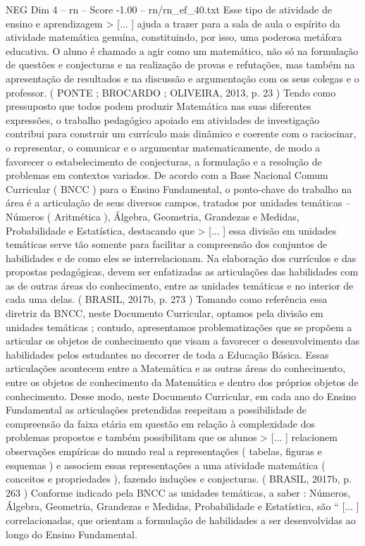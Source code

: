 \begin{textsample}{NEG Dim 4 – rn – Score -1.00 – rn/rn\_ef\_40.txt}
Esse tipo de atividade de ensino e aprendizagem > [... ] ajuda a trazer para a sala de aula o espírito da atividade matemática genuína, constituindo, por isso, uma poderosa metáfora educativa.
O aluno é chamado a agir como um matemático, não só na formulação de questões e conjecturas e na realização de provas e refutações, mas também na apresentação de resultados e na discussão e argumentação com os seus colegas e o professor. ( PONTE ; BROCARDO ; OLIVEIRA, 2013, p. 23 ) Tendo como pressuposto que todos podem produzir Matemática nas suas diferentes expressões, o trabalho pedagógico apoiado em atividades de investigação contribui para construir um currículo mais dinâmico e coerente com o raciocinar, o representar, o comunicar e o argumentar matematicamente, de modo a favorecer o estabelecimento de conjecturas, a formulação e a resolução de problemas em contextos variados.
De acordo com a Base Nacional Comum Curricular ( BNCC ) para o Ensino Fundamental, o ponto-chave do trabalho na área é a articulação de seus diversos campos, tratados por unidades temáticas – Números ( Aritmética ), Álgebra, Geometria, Grandezas e Medidas, Probabilidade e Estatística, destacando que > [... ] essa divisão em unidades temáticas serve tão somente para facilitar a compreensão dos conjuntos de habilidades e de como eles se interrelacionam.
Na elaboração dos currículos e das propostas pedagógicas, devem ser enfatizadas as articulações das habilidades com as de outras áreas do conhecimento, entre as unidades temáticas e no interior de cada uma delas. ( BRASIL, 2017b, p. 273 ) Tomando como referência essa diretriz da BNCC, neste Documento Curricular, optamos pela divisão em unidades temáticas ; contudo, apresentamos problematizações que se propõem a articular os objetos de conhecimento que visam a favorecer o desenvolvimento das habilidades pelos estudantes no decorrer de toda a Educação Básica.
Essas articulações acontecem entre a Matemática e as outras áreas do conhecimento, entre os objetos de conhecimento da Matemática e dentro dos próprios objetos de conhecimento.
Desse modo, neste Documento Curricular, em cada ano do Ensino Fundamental as articulações pretendidas respeitam a possibilidade de compreensão da faixa etária em questão em relação à complexidade dos problemas propostos e também possibilitam que os alunos > [... ] relacionem observações empíricas do mundo real a representações ( tabelas, figuras e esquemas ) e associem essas representações a uma atividade matemática ( conceitos e propriedades ), fazendo induções e conjecturas. ( BRASIL, 2017b, p. 263 ) Conforme indicado pela BNCC as unidades temáticas, a saber : Números, Álgebra, Geometria, Grandezas e Medidas, Probabilidade e Estatística, são “ [... ] correlacionadas, que orientam a formulação de habilidades a ser desenvolvidas ao longo do Ensino Fundamental.

\end{textsample}
